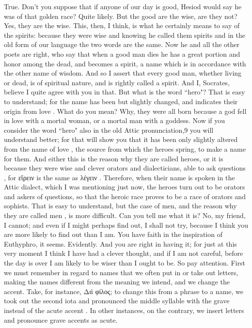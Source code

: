 \hermogenesspeaks
True.
\socratesspeaks
Don't you suppose that if anyone of our day is good,  Hesiod would say he was of that golden race?
\hermogenesspeaks
Quite likely.
\socratesspeaks
But the good are the wise, are they not?
\hermogenesspeaks
Yes, they are the wise.
\socratesspeaks
This, then, I think, is what he certainly means to say of the spirits: because they were wise and knowing  he called them spirits  and in the old form of our language the two words are the same. Now he and all the other poets are right, who say that when a good man dies  he has a great portion and honor among the dead, and becomes a spirit, a name which is in accordance with the other name of wisdom. And so I assert that every good man, whether living or dead, is of spiritual nature, and is rightly called a spirit.
\hermogenesspeaks
And I, Socrates, believe I quite agree with you in that. But what is the word ``hero"?
\socratesspeaks
That is easy to understand; for the name has been but slightly changed, and indicates their origin from love .
\hermogenesspeaks
What do you mean? 
\socratesspeaks
Why, they were all born because a god fell in love with a mortal woman, or a mortal man with a goddess. Now if you consider the word ``hero" also in the old Attic pronunciation,9 you will understand better; for that will show you that it has been only slightly altered from the name of love , the source from which the heroes spring, to make a name for them. And either this is the reason why they are called heroes, or it is because they were wise and clever orators and dialecticians, able to ask questions , for εἴρειν is the same as λέγειν . Therefore, when their name is spoken in the Attic dialect, which I was mentioning just now, the heroes turn out to be orators and askers of questions,  so that the heroic race proves to be a race of orators and sophists. That is easy to understand, but the case of men, and the reason why they are called men , is more difficult. Can you tell me what it is?
\hermogenesspeaks
No, my friend, I cannot; and even if I might perhaps find out, I shall not try, because I think you are more likely to find out than I am. 
\socratesspeaks
You have faith in the inspiration of Euthyphro, it seems.
\hermogenesspeaks
Evidently.
\socratesspeaks
And you are right in having it; for just at this very moment I think I have had a clever thought, and if I am not careful, before the day is over I am likely to be wiser than I ought to be. So pay attention. First we must remember in regard to names that we often put in or take out letters, making the names different from the meaning we intend, and we change the accent.  Take, for instance, Διὶ φίλος; to change this from a phrase to a name, we took out the second iota and pronounced the middle syllable with the grave instead of the acute accent . In other instances, on the contrary, we insert letters and pronounce grave accents as acute.
